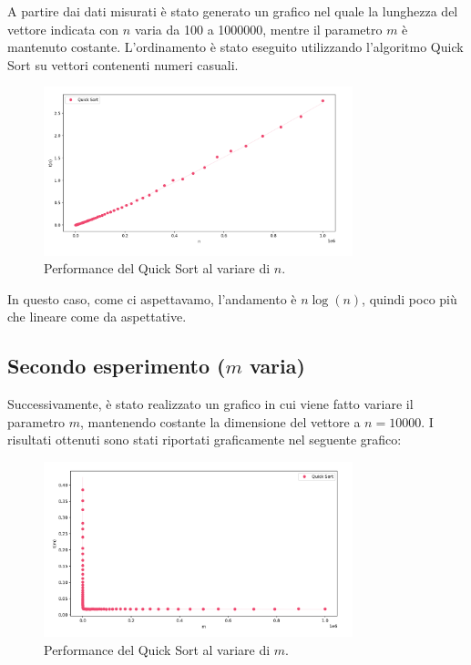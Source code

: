 \documentclass[a4paper, 12pt, oneside]{book}
\begin{document}
A partire dai dati misurati è stato generato un grafico nel quale la lunghezza del vettore indicata con \(n\) varia da 100 a 1000000, mentre il parametro \(m\) è mantenuto costante. L'ordinamento è stato eseguito utilizzando l'algoritmo Quick Sort su vettori contenenti numeri casuali.

\begin{figure}[H]
    \centering
    \includegraphics[width=0.8\textwidth]{images/grafico_quick_sort_n.png}
    \caption{Performance del Quick Sort al variare di \(n\).}
    \label{fig:quick_sort_n}
\end{figure}

\noindent In questo caso, come ci aspettavamo, l'andamento è $n \log(n)$, quindi poco più che lineare come da aspettative.


\subsection{Secondo esperimento ($m$ varia)}

\noindent Successivamente, è stato realizzato un grafico in cui viene fatto variare il parametro $m$, mantenendo costante la dimensione del vettore a \(n=10000\). I risultati ottenuti sono stati riportati graficamente nel seguente grafico:

\begin{figure}[H]
    \centering
    \includegraphics[width=0.8\textwidth]{images/grafico_quick_sort_m.png}
    \caption{Performance del Quick Sort al variare di \(m\).}
    \label{fig:quick_sort_m}
\end{figure}
\end{document}
